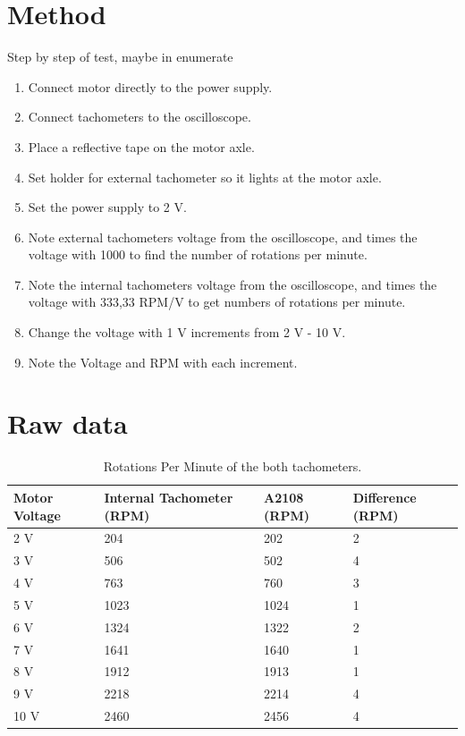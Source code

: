 \section*{Method}
Step by step of test, maybe in enumerate
\begin{enumerate}
\item Connect motor directly to the power supply.
\item Connect tachometers to the oscilloscope.
\item Place a reflective tape on the motor axle.
\item Set holder for external tachometer so it lights at the motor axle.
\item Set the power supply to 2 V.
\item Note external tachometers voltage from the oscilloscope, and times the voltage with 1000 to find the number of rotations per minute.
\item Note the internal tachometers voltage from the oscilloscope, and times the voltage with 333,33 RPM/V to get numbers of rotations per minute.
\item Change the voltage with 1 V increments from 2 V - 10 V.
\item Note the Voltage and RPM with each increment.
\end{enumerate}
\section*{Raw data}
\begin{table}[htbp]
\centering
\caption{Rotations Per Minute of the both tachometers.}
\label{RPMData}
\begin{tabular}{llll}
Motor Voltage & Internal Tachometer {(}RPM{)} & A2108 {(}RPM{)} & Difference {(}RPM{)} \\ \hline  \rowcolor{lightGrey}
2 V     & 204              & 202             & 2                    \\
3 V     & 506              & 502             & 4                    \\  \rowcolor{lightGrey}
4 V     & 763              & 760             & 3                    \\ 
5 V     & 1023             & 1024            & 1                    \\  \rowcolor{lightGrey}
6 V     & 1324             & 1322            & 2                    \\
7 V     & 1641             & 1640            & 1                    \\  \rowcolor{lightGrey}
8 V     & 1912             & 1913            & 1                    \\
9 V     & 2218             & 2214            & 4                    \\ \rowcolor{lightGrey}
10 V    & 2460             & 2456            & 4                    
\end{tabular}
\end{table}

